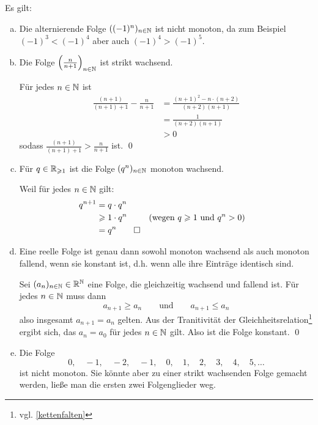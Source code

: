 \begin{bsp} Es gilt:
\begin{enumerate}[a)]
 \item Die alternierende Folge $((-1)^n)_{n\in \Nz}$ ist nicht monoton, da zum Beispiel $(-1)^3< (-1)^4$ aber auch $(-1)^4>(-1)^5$.
 \item Die Folge $\left(\frac{n}{n+1}\right)_{n\in \Nz}$ ist strikt wachsend.
 \begin{bew}
Für jedes $n\in \Nz$ ist
 \begin{align*}
  \frac{(n+1)}{(n+1)+1} - \frac{n}{n+1} & = \frac{(n+1)^2- n\cdot (n+2)}{(n+2)(n+1)} \\
  & = \frac{1}{(n+2)(n+1)} \\
  & >0
 \end{align*}
sodass $\frac{(n+1)}{(n+1)+1} > \frac{n}{n+1}$ ist. \qed
\end{bew}
 \item Für $q\in \Rz_{\geq 1}$ ist die Folge $(q^n)_{n\in \Nz}$ monoton wachsend.
 \begin{bew}
  Weil für jedes $n\in \Nz$ gilt:
  \begin{align*}
   q^{n+1} & = q \cdot q^n \\
   & \geq 1 \cdot q^n && (\text{wegen $q\geq 1$ und $q^n>0$})\\
   & = q^n \qed
  \end{align*}
 \end{bew}
 \item Eine reelle Folge ist genau dann sowohl monoton wachsend als auch monoton fallend, wenn sie konstant ist, d.h. wenn alle ihre Einträge identisch sind.
 \begin{bew}
  Sei $(a_n)_{n\in \Nz}\in \Rz^\Nz$ eine Folge, die gleichzeitig wachsend und fallend ist. Für jedes $n\in \Nz$ muss dann
  \[ a_{n+1}\geq a_n\qquad\text{und}\qquad a_{n+1}\leq a_n \]
  also insgesamt $a_{n+1}=a_n$ gelten. Aus der Tranitivität der Gleichheitsrelation\footnote{vgl. \cref{kettenfalten}} ergibt sich, das $a_n=a_0$ für jedes $n\in \Nz$ gilt. Also ist die Folge konstant. \qed
 \end{bew}
 \item Die Folge
 \[ 0,\quad -1,\quad -2,\quad -1,\quad 0,\quad 1,\quad 2,\quad 3,\quad 4, \quad 5,\dots \]
 ist nicht monoton. Sie könnte aber zu einer strikt wachsenden Folge gemacht werden, ließe man die ersten zwei Folgenglieder weg.
\end{enumerate}
\end{bsp}




